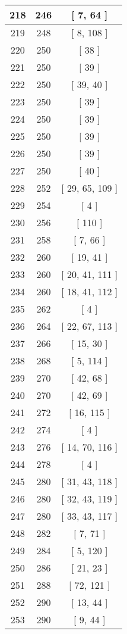 \begin{center}
\begin{longtable}[H]{|| c c c ||}
\hline
218 & 246 & [ 7, 64 ] \\ 
\hline
219 & 248 & [ 8, 108 ] \\ 
\hline
220 & 250 & [ 38 ] \\ 
\hline
221 & 250 & [ 39 ] \\ 
\hline
222 & 250 & [ 39, 40 ] \\ 
\hline
223 & 250 & [ 39 ] \\ 
\hline
224 & 250 & [ 39 ] \\ 
\hline
225 & 250 & [ 39 ] \\ 
\hline
226 & 250 & [ 39 ] \\ 
\hline
227 & 250 & [ 40 ] \\ 
\hline
228 & 252 & [ 29, 65, 109 ] \\ 
\hline
229 & 254 & [ 4 ] \\ 
\hline
230 & 256 & [ 110 ] \\ 
\hline
231 & 258 & [ 7, 66 ] \\ 
\hline
232 & 260 & [ 19, 41 ] \\ 
\hline
233 & 260 & [ 20, 41, 111 ] \\ 
\hline
234 & 260 & [ 18, 41, 112 ] \\ 
\hline
235 & 262 & [ 4 ] \\ 
\hline
236 & 264 & [ 22, 67, 113 ] \\ 
\hline
237 & 266 & [ 15, 30 ] \\ 
\hline
238 & 268 & [ 5, 114 ] \\ 
\hline
239 & 270 & [ 42, 68 ] \\ 
\hline
240 & 270 & [ 42, 69 ] \\ 
\hline
241 & 272 & [ 16, 115 ] \\ 
\hline
242 & 274 & [ 4 ] \\ 
\hline
243 & 276 & [ 14, 70, 116 ] \\ 
\hline
244 & 278 & [ 4 ] \\ 
\hline
245 & 280 & [ 31, 43, 118 ] \\ 
\hline
246 & 280 & [ 32, 43, 119 ] \\ 
\hline
247 & 280 & [ 33, 43, 117 ] \\ 
\hline
248 & 282 & [ 7, 71 ] \\ 
\hline
249 & 284 & [ 5, 120 ] \\ 
\hline
250 & 286 & [ 21, 23 ] \\ 
\hline
251 & 288 & [ 72, 121 ] \\ 
\hline
252 & 290 & [ 13, 44 ] \\ 
\hline
253 & 290 & [ 9, 44 ] \\ 

\end{longtable}
\end{center}
